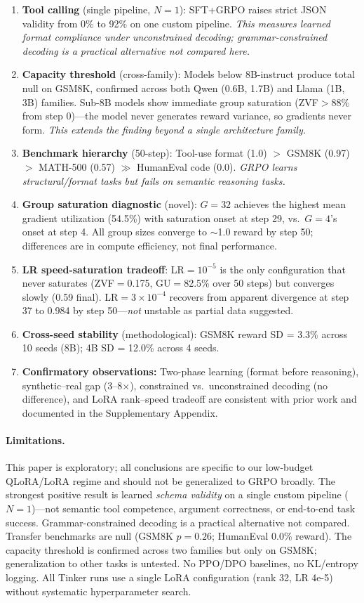\documentclass{article}
\begin{document}
\begin{enumerate}
    \item \textbf{Tool calling} (single pipeline, $N{=}1$): SFT+GRPO raises strict JSON validity from 0\% to 92\% on one custom pipeline. \emph{This measures learned format compliance under unconstrained decoding; grammar-constrained decoding is a practical alternative not compared here.}
    \item \textbf{Capacity threshold} (cross-family): Models below 8B-instruct produce total null on GSM8K, confirmed across both Qwen (0.6B, 1.7B) and Llama (1B, 3B) families. Sub-8B models show immediate group saturation (ZVF$>$88\% from step 0)---the model never generates reward variance, so gradients never form. \emph{This extends the finding beyond a single architecture family.}
    \item \textbf{Benchmark hierarchy} (50-step): Tool-use format (1.0) $>$ GSM8K (0.97) $>$ MATH-500 (0.57) $\gg$ HumanEval code (0.0). \emph{GRPO learns structural/format tasks but fails on semantic reasoning tasks.}
    \item \textbf{Group saturation diagnostic} (novel): $G{=}32$ achieves the highest mean gradient utilization (54.5\%) with saturation onset at step 29, vs.\ $G{=}4$'s onset at step 4. All group sizes converge to ${\sim}$1.0 reward by step 50; differences are in compute efficiency, not final performance.
    \item \textbf{LR speed-saturation tradeoff}: LR$=10^{-5}$ is the only configuration that never saturates (ZVF$=$0.175, GU$=$82.5\% over 50 steps) but converges slowly (0.59 final). LR$=3\times10^{-4}$ recovers from apparent divergence at step 37 to 0.984 by step 50---\emph{not} unstable as partial data suggested.
    \item \textbf{Cross-seed stability} (methodological): GSM8K reward SD = 3.3\% across 10 seeds (8B); 4B SD = 12.0\% across 4 seeds.
    \item \textbf{Confirmatory observations:} Two-phase learning (format before reasoning), synthetic--real gap (3--8$\times$), constrained vs.\ unconstrained decoding (no difference), and LoRA rank--speed tradeoff are consistent with prior work and documented in the Supplementary Appendix.
\end{enumerate}

\paragraph{Limitations.} This paper is exploratory; all conclusions are specific to our low-budget QLoRA/LoRA regime and should not be generalized to GRPO broadly. The strongest positive result is learned \emph{schema validity} on a single custom pipeline ($N{=}1$)---not semantic tool competence, argument correctness, or end-to-end task success. Grammar-constrained decoding is a practical alternative not compared. Transfer benchmarks are null (GSM8K $p{=}0.26$; HumanEval 0.0\% reward). The capacity threshold is confirmed across two families but only on GSM8K; generalization to other tasks is untested. No PPO/DPO baselines, no KL/entropy logging. All Tinker runs use a single LoRA configuration (rank 32, LR 4e-5) without systematic hyperparameter search.
\end{document}
